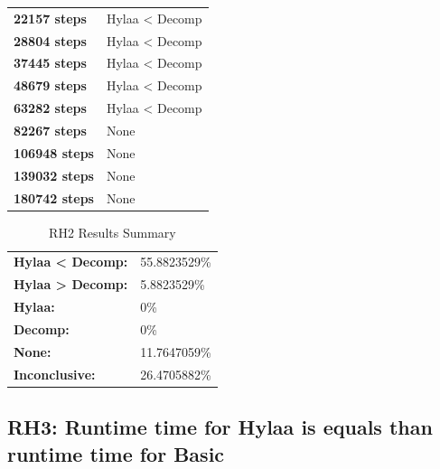 \documentclass{article}\usepackage[]{graphicx}\usepackage[]{color}
\begin{document}
\begin{table}[H]
\begin{tabular}{ll}
	\textbf{22157 steps} & Hylaa \textless{} Decomp \\
	\textbf{28804 steps} & Hylaa \textless{} Decomp \\
	\textbf{37445 steps} & Hylaa \textless{} Decomp \\
	\textbf{48679 steps} & Hylaa \textless{} Decomp \\
	\textbf{63282 steps} & Hylaa \textless{} Decomp \\
	\textbf{82267 steps} & None \\
	\textbf{106948 steps} & None \\
	\textbf{139032 steps} & None \\
	\textbf{180742 steps} & None \\
	\end{tabular}
	\end{table}

	\begin{table}[H]
	\centering
	\caption{RH2 Results Summary}
	\begin{tabular}{ll}
	\textbf{Hylaa \textless{} Decomp:}& 55.8823529\% \\
	\textbf{Hylaa \textgreater{} Decomp:}& 5.8823529\%\\
	\textbf{Hylaa:} & 0\%\\
	\textbf{Decomp:} & 0\%\\
	\textbf{None:}& 11.7647059\%\\
	\textbf{Inconclusive:}& 26.4705882\%
			
	
	\end{tabular}
	\end{table}
	
	
	



\subsection{RH3: Runtime time for Hylaa is equals than runtime time for Basic}
\end{document}
